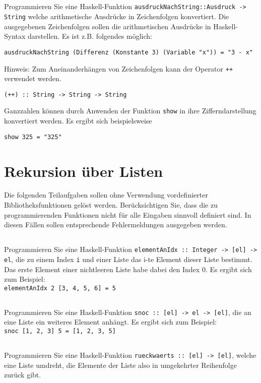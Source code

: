 \documentclass[
  10pt,                   %
  DIV12,
  german,                 %
  oneside,                %
  parskip=half,           %
  headings=normal,        %
  captions=tableheading,  %
]{scrartcl}
\begin{document}
\subsection{}
Programmieren Sie eine Haskell-Funktion \lstinline|ausdruckNachString::Ausdruck -> String|
welche arithmetische Ausdrücke in Zeichenfolgen konvertiert. Die ausgegebenen
Zeichenfolgen sollen die arithmetischen Ausdrücke in Haskell-Syntax darstellen. Es ist z.B. folgendes möglich:
\begin{lstlisting}
ausdruckNachString (Differenz (Konstante 3) (Variable "x")) = "3 - x"
\end{lstlisting}
Hinweis:
Zum Aneinanderhängen von Zeichenfolgen kann der Operator \lstinline|++| verwendet werden.
\begin{lstlisting}
(++) :: String -> String -> String
\end{lstlisting}
Ganzzahlen können durch Anwenden der Funktion \lstinline|show| in
ihre Zifferndarstellung konvertiert werden. Es ergibt sich beispielsweise
\begin{lstlisting}
show 325 = "325"
\end{lstlisting}
\section{Rekursion über Listen}
Die folgenden Teilaufgaben sollen ohne Verwendung vordefinierter Bibliotheksfunktionen gelöst werden. Berücksichtigen Sie, dass die zu programmierenden Funktionen nicht für alle Eingaben sinnvoll definiert sind. In diesen Fällen sollen entsprechende Fehlermeldungen ausgegeben werden.
\subsection{}	
Programmieren Sie eine Haskell-Funktion \lstinline|elementAnIdx :: Integer -> [el] -> el|, die zu einem Index \lstinline|i| und einer Liste das i-te Element dieser Liste bestimmt. Das erste Element einer nichtleeren Liste habe dabei den Index $0$. Es ergibt sich zum Beispiel:\\
\lstinline|elementAnIdx 2 [3, 4, 5, 6] = 5|
\subsection{}
Programmieren Sie eine Haskell-Funktion \lstinline|snoc :: [el] -> el -> [el]|, die an eine Liste ein weiteres Element anhängt. Es ergibt sich zum Beispiel:\\
\lstinline|snoc [1, 2, 3] 5 = [1, 2, 3, 5]|
\subsection{}
Programmieren Sie eine Haskell-Funktion \lstinline|rueckwaerts :: [el] -> [el]|, welche eine Liste umdreht, die Elemente der Liste also in umgekehrter Reihenfolge zurück gibt.
\end{document}
